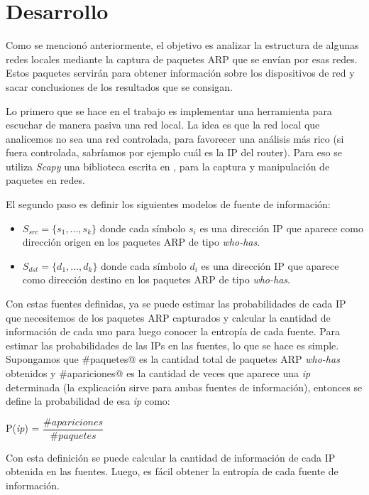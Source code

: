 \section{Desarrollo}

Como se mencion\'o anteriormente, el objetivo es analizar la estructura de algunas redes locales
mediante la captura de paquetes ARP que se env\'ian por esas redes. Estos paquetes servir\'an para
obtener informaci\'on sobre los dispositivos de red y sacar conclusiones de los resultados que se 
consigan.

Lo primero que se hace en el trabajo es implementar una herramienta para escuchar de manera pasiva
una red local. La idea es que la red local que analicemos no sea una red controlada, para favorecer
una an\'alisis m\'as rico (si fuera controlada, sabr\'iamos por ejemplo cu\'al es la IP del router).
Para eso se utiliza \emph{Scapy} una biblioteca escrita en \verb@Python@, para la captura y 
manipulaci\'on de paquetes en redes.

El segundo paso es definir los siguientes modelos de fuente de informaci\'on:

\begin{itemize}
\item $S_{src} = \{s_1,...,s_k\}$ donde cada s\'imbolo $s_i$ es una direcci\'on IP que aparece como 
direcci\'on origen en los paquetes ARP de tipo \emph{who-has}. 

\item $S_{dst} = \{d_1,...,d_k\}$ donde cada s\'imbolo $d_i$ es una direcci\'on IP que aparece como 
direcci\'on destino en los paquetes ARP de tipo \emph{who-has}.
\end{itemize}

Con estas fuentes definidas, ya se puede estimar las probabilidades de cada IP que necesitemos de 
los paquetes ARP capturados y calcular la cantidad de informaci\'on de cada uno para luego conocer
la entrop\'ia de cada fuente. Para estimar las probabilidades de las IPs en las fuentes, lo que se 
hace es simple. Supongamos que \verb@#paquetes@ es la cantidad total de paquetes ARP 
\emph{who-has} obtenidos y \verb@#apariciones@ es la cantidad de veces que aparece una 
\emph{ip} determinada (la explicaci\'on sirve para ambas fuentes de informaci\'on), entonces se 
define la probabilidad de esa \emph{ip} como: 

P(\emph{ip}) = $\dfrac{\#apariciones}{\#paquetes}$

Con esta definici\'on se puede calcular la cantidad de informaci\'on de cada IP obtenida en las 
fuentes. Luego, es f\'acil obtener la entrop\'ia de cada fuente de informaci\'on.

